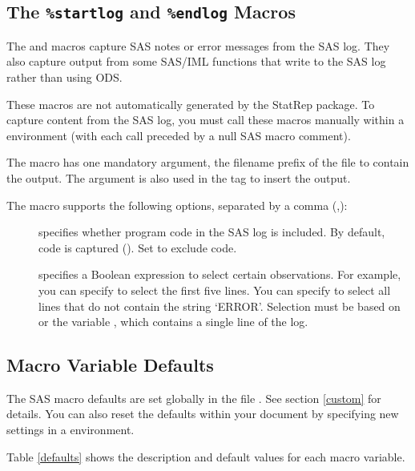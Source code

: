 \documentclass[article,oneside]{memoir}
\newcommand*{\StatRep}{\textsf{StatRep}\xspace}
\begin{document}
 \subsection{The \texttt{\%startlog} and \texttt{\%endlog} Macros}\label{startlog}
 
  The  and  macros capture SAS notes
  or error messages from the SAS log. They also capture output
  from some SAS/IML functions that write to the SAS log rather than using ODS. 
  
  These macros are not automatically generated by the \StatRep package.
  To capture content from the SAS log, you must call these macros
  manually within a  environment (with each call preceded
  by a null SAS macro comment).
  
  The  macro has one mandatory argument, the filename prefix
  of the file to contain the output. The argument is also used in the  
  tag to insert the output.
  
  The  macro supports the following options,
  separated by a comma (,):
  
  \begin{description}
  \item[] specifies whether program code in the SAS log is included.
  By default, code is captured (). Set  to exclude code.
  \item[] specifies a Boolean expression to select  
  certain observations. For example, you can specify 
  to select the first five lines.  You can specify 
   to select all lines that do not contain the string 
  `ERROR'. Selection must be based on  or the variable , which 
  contains a single line of the log.
  \end{description}
  
  \subsection{Macro Variable Defaults}\label{secdefaults}
 
  The SAS macro defaults are set globally in the file .
  See section \ref{custom} for details. You can also reset the
  defaults within your document by specifying new settings in a 
  environment.
  
  Table \ref{defaults} shows the description and default values for each
  macro variable.
  
\end{document}
